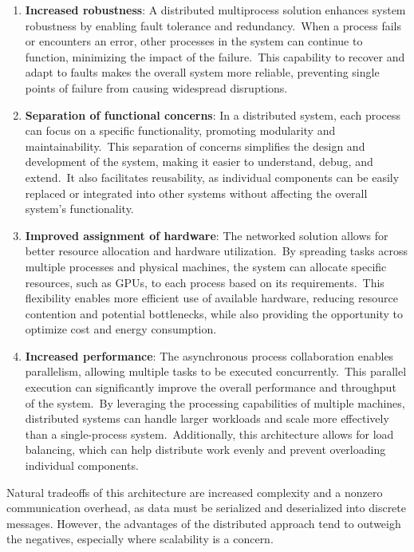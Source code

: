 \begin{enumerate}
    \item \textbf{Increased robustness}: A distributed multiprocess solution enhances system robustness by enabling fault tolerance and redundancy.\ When a process fails or encounters an error, other processes in the system can continue to function, minimizing the impact of the failure.\ This capability to recover and adapt to faults makes the overall system more reliable, preventing single points of failure from causing widespread disruptions.
    \item \textbf{Separation of functional concerns}: In a distributed system, each process can focus on a specific functionality, promoting modularity and maintainability.\ This separation of concerns simplifies the design and development of the system, making it easier to understand, debug, and extend.\ It also facilitates reusability, as individual components can be easily replaced or integrated into other systems without affecting the overall system's functionality.
    \item \textbf{Improved assignment of hardware}: The networked solution allows for better resource allocation and hardware utilization.\ By spreading tasks across multiple processes and physical machines, the system can allocate specific resources, such as GPUs, to each process based on its requirements.\ This flexibility enables more efficient use of available hardware, reducing resource contention and potential bottlenecks, while also providing the opportunity to optimize cost and energy consumption.
    \item \textbf{Increased performance}: The asynchronous process collaboration enables parallelism, allowing multiple tasks to be executed concurrently.\ This parallel execution can significantly improve the overall performance and throughput of the system.\ By leveraging the processing capabilities of multiple machines, distributed systems can handle larger workloads and scale more effectively than a single-process system.\ Additionally, this architecture allows for load balancing, which can help distribute work evenly and prevent overloading individual components.
\end{enumerate}

Natural tradeoffs of this architecture are increased complexity and a nonzero communication overhead, as data must be serialized and deserialized into discrete messages.
However, the advantages of the distributed approach tend to outweigh the negatives, especially where scalability is a concern.

